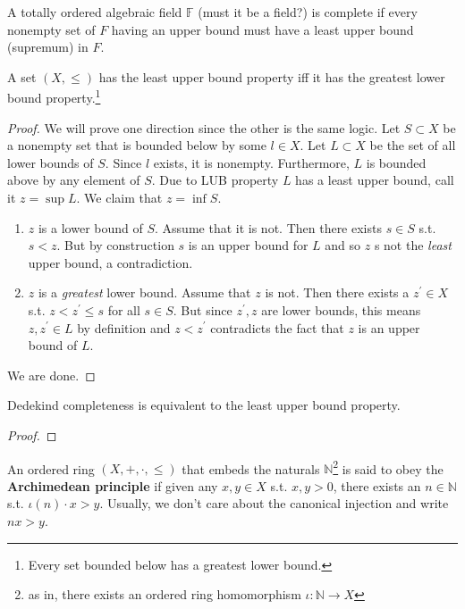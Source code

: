   \begin{definition}
    A totally ordered algebraic field $\mathbb{F}$ (must it be a field?) is complete if every nonempty set of $F$ having an upper bound must have a least upper bound (supremum) in $F$. 
  \end{definition} 

  \begin{theorem}
    A set $(X, \leq)$ has the least upper bound property iff it has the greatest lower bound property.\footnote{Every set bounded below has a greatest lower bound.} 
  \end{theorem}
  \begin{proof}
    We will prove one direction since the other is the same logic. Let $S \subset X$ be a nonempty set that is bounded below by some $l \in X$. Let $L \subset X$ be the set of all lower bounds of $S$. Since $l$ exists, it is nonempty. Furthermore, $L$ is bounded above by any element of $S$. Due to LUB property $L$ has a least upper bound, call it $z = \sup{L}$. We claim that $z = \inf{S}$. 
    \begin{enumerate}
      \item $z$ is a lower bound of $S$. Assume that it is not. Then there exists $s \in S$ s.t. $s < z$. But by construction $s$ is an upper bound for $L$ and so $z$ s not the \textit{least} upper bound, a contradiction. 
      \item $z$ is a \textit{greatest} lower bound. Assume that $z$ is not. Then there exists a $z^\prime \in X$ s.t. $z < z^\prime \leq s$ for all $s \in S$. But since $z^\prime, z$ are lower bounds, this means $z, z^\prime \in L$ by definition and $z < z^\prime$ contradicts the fact that $z$ is an upper bound of $L$. 
    \end{enumerate}
    We are done. 
  \end{proof}

  \begin{theorem}
    Dedekind completeness is equivalent to the least upper bound property. 
  \end{theorem}
  \begin{proof}
    
  \end{proof}

  \begin{definition}
    An ordered ring $(X, +, \cdot, \leq)$ that embeds the naturals $\mathbb{N}$\footnote{as in, there exists an ordered ring homomorphism $\iota: \mathbb{N} \rightarrow X$} is said to obey the \textbf{Archimedean principle} if given any $x, y \in X$ s.t. $x, y > 0$, there exists an $n \in \mathbb{N}$ s.t. $\iota(n) \cdot x > y$. Usually, we don't care about the canonical injection and write $nx > y$. 
  \end{definition}


